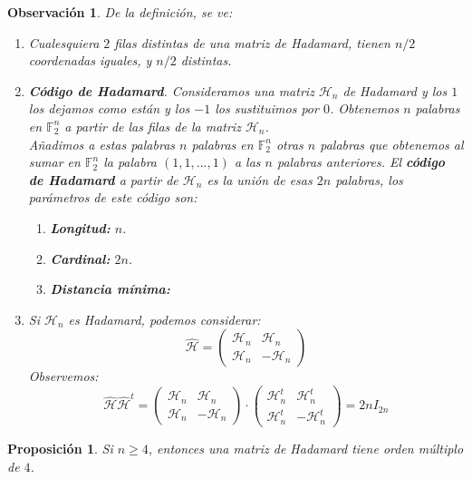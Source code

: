 \documentclass[spanish]{book}
\newtheorem{obsv}{Observación}
\newtheorem{proposi}{Proposición}
\begin{document}
\begin{obsv}
	De la definición, se ve:
	\begin{enumerate}
		\item Cualesquiera $2$ filas distintas de una matriz de Hadamard, tienen $n/2$ coordenadas iguales, y $n/2$ distintas.
		\item \textbf{Código de Hadamard}. Consideramos una matriz $\mathcal{H}_n$ de Hadamard y los $1$ los dejamos como están y los $-1$ los sustituimos por $0$. Obtenemos $n$ palabras en $\mathbb{F}_2^n$ a partir de las filas de la matriz $\mathcal{H}_n$. \\
		Añadimos a estas palabras $n$ palabras en $\mathbb{F}_2^n$ otras $n$ palabras que obtenemos al sumar en $\mathbb{F}_2^n$ la palabra $(1, 1, ..., 1)$ a las $n$ palabras anteriores. El \textbf{código de Hadamard} a partir de $\mathcal{H}_n$ es la unión de esas $2n$ palabras, los parámetros de este código son:
		\begin{enumerate}
			\item \textbf{Longitud: } $n$.
			\item \textbf{Cardinal: } $2n$.
			\item \textbf{Distancia mínima: } 
		\end{enumerate}
		
		\item Si $\mathcal{H}_n$ es Hadamard, podemos considerar:
		$$ \hat{\mathcal{H}}=
		\left(
		\begin{array}{c|c}
		\mathcal{H}_n & \mathcal{H}_n\\ \hline
		\mathcal{H}_n & -\mathcal{H}_n
		\end{array}
		\right)
		$$
		Observemos: 
		$$
		\hat{\mathcal{H}}\hat{\mathcal{H}}^t=
		\left(
		\begin{array}{c|c}
		\mathcal{H}_n & \mathcal{H}_n\\ \hline
		\mathcal{H}_n & -\mathcal{H}_n
		\end{array}
		\right) \cdot
		\left(
			\begin{array}{c|c}
			\mathcal{H}_n^t & \mathcal{H}_n^t\\ \hline
			\mathcal{H}_n^t & -\mathcal{H}_n^t
			\end{array}
			\right)=2n I_{2n}
		$$
	\end{enumerate}
\end{obsv}

\begin{proposi}
	Si $n\geq 4$, entonces una matriz de Hadamard tiene orden múltiplo de $4$.
\end{proposi}
\end{document}
